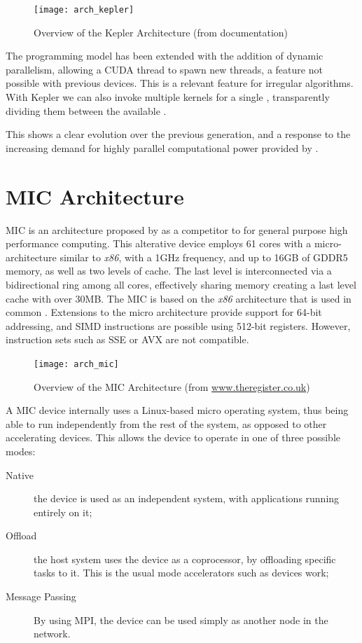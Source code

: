 \documentclass[main.tex]{subfiles}
\begin{document}
\begin{figure}[!htp]
  \centering
  \texttt{[image: arch\_kepler]}
  \caption[Overview of the Kepler Architecture]{Overview of the Kepler Architecture (from \nvidia documentation)}
  \label{fig:kepler}
\end{figure}

The programming model has been extended with the addition of dynamic parallelism, allowing a \acs{CUDA} thread to spawn new threads, a feature not possible with previous \nvidia devices. This is a relevant feature for irregular algorithms. With Kepler we can also invoke multiple kernels for a single \gpu, transparently dividing them between the available \smxs.

This shows a clear evolution over the previous generation, and a response to the increasing demand for highly parallel computational power provided by \gpus.


\section{MIC Architecture}

\acf{MIC} \cite{Intel:MIC:QuickStartGuide} is an architecture proposed by \intel as a competitor to \gpus for general purpose high performance computing. This alterative device employs 61 cores with a micro-architecture similar to \textit{x86}, with a 1GHz frequency, and up to 16GB of GDDR5 memory, as well as two levels of cache. The last level is interconnected via a bidirectional ring among all cores, effectively sharing memory creating a last level cache with over 30MB.
The \acs{MIC} is based on the \textit{x86} architecture that is used in common \cpus. Extensions to the micro architecture provide support for 64-bit addressing, and SIMD instructions are possible using 512-bit registers. However, instruction sets such as \acf{SSE} or \acf{AVX} are not compatible.

\begin{figure}[!htp]
  \centering
  \texttt{[image: arch\_mic]}
  \caption[Overview of the \acs{MIC} Architecture]{Overview of the \acs{MIC} Architecture (from \url{www.theregister.co.uk})}
  \label{fig:mic}
\end{figure}

A \acs{MIC} device internally uses a Linux-based micro operating system, thus being able to run independently from the rest of the system, as opposed to other accelerating devices. This allows the device to operate in one of three possible modes:
\begin{description}
\item[Native] the device is used as an independent system, with applications running entirely on it;
\item[Offload] the host system uses the device as a coprocessor, by offloading specific tasks to it. This is the usual mode accelerators such as \cuda devices work;
\item[Message Passing] By using \acs{MPI}, the device can be used simply as another node in the network.
\end{description}
\end{document}
